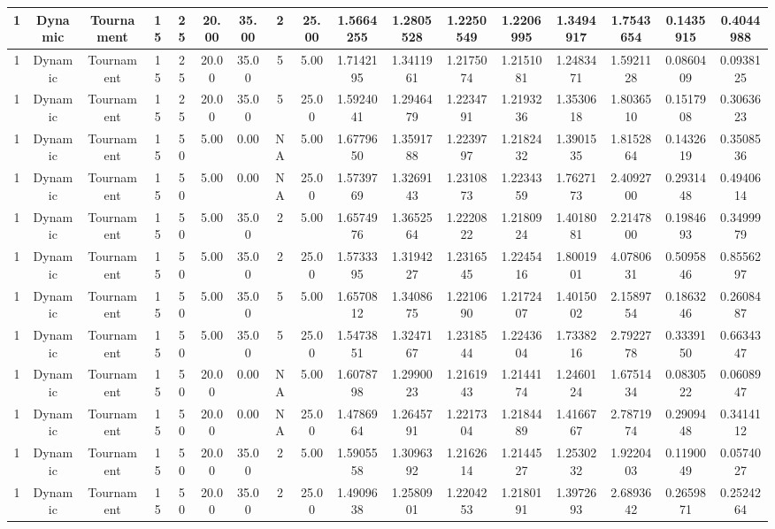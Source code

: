 \documentclass[a4paper]{article}
\begin{document}
\begin{center}
\begin{tabular}{ | c | c | c | c | c | c | c | c | c | c | c | c | c | c | c | c | c | }
		\hline
		1	&	Dynamic	&	Tournament	&	15	&	25	&	20.00	&	35.00	&	2	&	25.00	&	1.5664255	&	1.2805528	&	1.2250549	&	1.2206995	&	1.3494917	&	1.7543654	&	0.1435915	&	0.4044988 \\
		\hline
		1	&	Dynamic	&	Tournament	&	15	&	25	&	20.00	&	35.00	&	5	&	5.00	&	1.7142195	&	1.3411961	&	1.2175074	&	1.2151081	&	1.2483471	&	1.5921128	&	0.0860409	&	0.0938125 \\
		\hline
		1	&	Dynamic	&	Tournament	&	15	&	25	&	20.00	&	35.00	&	5	&	25.00	&	1.5924041	&	1.2946479	&	1.2234791	&	1.2193236	&	1.3530618	&	1.8036510	&	0.1517908	&	0.3063623 \\
		\hline
		1	&	Dynamic	&	Tournament	&	15	&	50	&	5.00	&	0.00	&	NA	&	5.00	&	1.6779650	&	1.3591788	&	1.2239797	&	1.2182432	&	1.3901535	&	1.8152864	&	0.1432619	&	0.3508536 \\
		\hline
		1	&	Dynamic	&	Tournament	&	15	&	50	&	5.00	&	0.00	&	NA	&	25.00	&	1.5739769	&	1.3269143	&	1.2310873	&	1.2234359	&	1.7627173	&	2.4092700	&	0.2931448	&	0.4940614 \\
		\hline
		1	&	Dynamic	&	Tournament	&	15	&	50	&	5.00	&	35.00	&	2	&	5.00	&	1.6574976	&	1.3652564	&	1.2220822	&	1.2180924	&	1.4018081	&	2.2147800	&	0.1984693	&	0.3499979 \\
		\hline
		1	&	Dynamic	&	Tournament	&	15	&	50	&	5.00	&	35.00	&	2	&	25.00	&	1.5733395	&	1.3194227	&	1.2316545	&	1.2245416	&	1.8001901	&	4.0780631	&	0.5095846	&	0.8556297 \\
		\hline
		1	&	Dynamic	&	Tournament	&	15	&	50	&	5.00	&	35.00	&	5	&	5.00	&	1.6570812	&	1.3408675	&	1.2210690	&	1.2172407	&	1.4015002	&	2.1589754	&	0.1863246	&	0.2608487 \\
		\hline
		1	&	Dynamic	&	Tournament	&	15	&	50	&	5.00	&	35.00	&	5	&	25.00	&	1.5473851	&	1.3247167	&	1.2318544	&	1.2243604	&	1.7338216	&	2.7922778	&	0.3339150	&	0.6634347 \\
		\hline
		1	&	Dynamic	&	Tournament	&	15	&	50	&	20.00	&	0.00	&	NA	&	5.00	&	1.6078798	&	1.2990023	&	1.2161943	&	1.2144174	&	1.2460124	&	1.6751434	&	0.0830522	&	0.0608947 \\
		\hline
		1	&	Dynamic	&	Tournament	&	15	&	50	&	20.00	&	0.00	&	NA	&	25.00	&	1.4786964	&	1.2645791	&	1.2217304	&	1.2184489	&	1.4166767	&	2.7871974	&	0.2909448	&	0.3414112 \\
		\hline
		1	&	Dynamic	&	Tournament	&	15	&	50	&	20.00	&	35.00	&	2	&	5.00	&	1.5905558	&	1.3096392	&	1.2162614	&	1.2144527	&	1.2530232	&	1.9220403	&	0.1190049	&	0.0574027 \\
		\hline
		1	&	Dynamic	&	Tournament	&	15	&	50	&	20.00	&	35.00	&	2	&	25.00	&	1.4909638	&	1.2580901	&	1.2204253	&	1.2180191	&	1.3972693	&	2.6893642	&	0.2659871	&	0.2524264 \\

\end{tabular}
\end{center}
\end{document}

